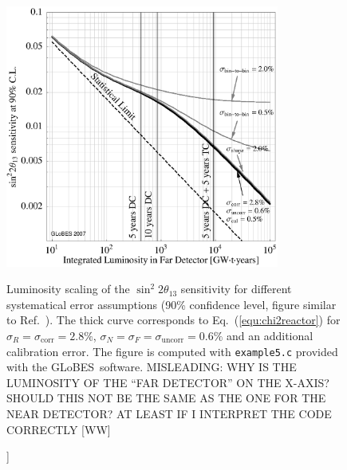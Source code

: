 \documentclass[12pt,a4paper]{article}
\newcommand{\capdef}{}
\newcommand{\mycaption}[2][\capdef]{\renewcommand{\capdef}{#2}%
       \caption[#1]{{\footnotesize #2}}}
\newcommand{\eq}{Eq.}
\newcommand{\Ref}{Ref.}
\newcommand{\stheta}{\sin^2 2 \theta_{13}}
\newcommand{\GLOBES}{{\sf GLoBES}}
\newcommand{\equ}[1]{\eq~(\ref{equ:#1})}
\begin{document}
\begin{figure}[t]
\begin{center}
\includegraphics[width=9cm]{reactor}
\end{center}
\mycaption{\label{fig:reactor} Luminosity scaling of the $\stheta$ sensitivity for different systematical error assumptions (90\% confidence level, figure similar to \Ref~\cite{Huber:2006vr}). The thick curve corresponds to \equ{chi2reactor} for $\sigma_R=\sigma_{\mathrm{corr}}=2.8\%$, $\sigma_N=\sigma_F=\sigma_{\mathrm{uncorr}}=0.6\%$ and an additional calibration error. The figure is computed with {\tt example5.c} provided with the \GLOBES\ software.
 MISLEADING: WHY IS THE LUMINOSITY
OF THE ``FAR DETECTOR'' ON THE X-AXIS? SHOULD THIS NOT BE THE SAME AS THE ONE FOR THE NEAR DETECTOR? 
AT LEAST IF I INTERPRET THE CODE CORRECTLY [WW]}
\end{figure}
\end{document}
